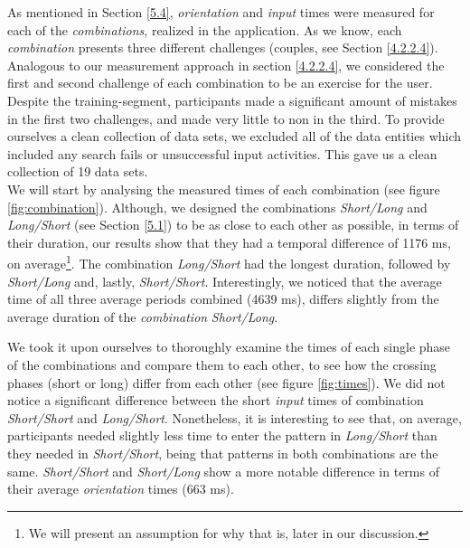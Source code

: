  As mentioned in Section \ref{5.4}, \textit{orientation} and \textit{input} times were measured for each of the \textit{combinations}, realized in the application. As we know, each \textit{combination} presents three different challenges (couples, see Section \ref{4.2.2.4}). Analogous to our measurement approach in section \ref{4.2.2.4}, we considered the first and second challenge of each combination to be an exercise for the user. Despite the training-segment, participants made a significant amount of mistakes in the first two challenges, and made very little to non in the third. To provide ourselves a clean collection of data sets, we excluded all of the data entities which included any search fails or unsuccessful input activities. This gave us a clean collection of 19 data sets. \\

We will start by analysing the measured times of each combination (see figure \ref{fig:combination}). Although, we designed the combinations \textit{Short/Long} and \textit{Long/Short} (see Section \ref{5.1}) to be as close to each other as possible, in terms of their duration, our results show that they had a temporal difference of 1176 ms, on average\footnote{We will present an assumption for why that is, later in our discussion.}. The combination \textit{Long/Short} had the longest duration, followed by \textit{Short/Long} and, lastly, \textit{Short/Short}.  Interestingly, we noticed that the average time of all three average periods combined (4639 ms), differs slightly from the average duration of the \textit{combination} \textit{Short/Long}. 

We took it upon ourselves to thoroughly examine the times of each single phase of the combinations and compare them to each other, to see how the crossing phases (short or long) differ from each other (see figure \ref{fig:times}). We did not notice a significant difference between the short \textit{input} times of combination \textit{Short/Short} and \textit{Long/Short}. Nonetheless, it is interesting to see that, on average, participants needed slightly less time to enter the pattern in \textit{Long/Short} than they needed in \textit{Short/Short}, being that patterns in both combinations are the same. \textit{Short/Short} and \textit{Short/Long} show a more notable difference in terms of their average \textit{orientation} times (663 ms). 


